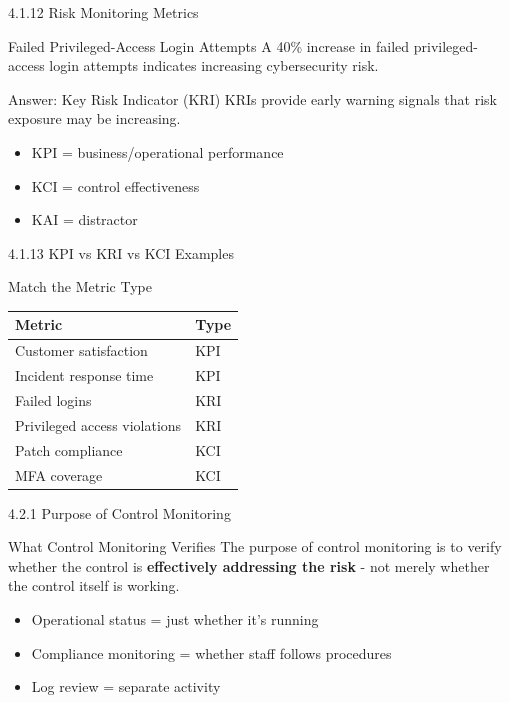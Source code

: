 \documentclass{beamer}
\begin{document}
	\begin{frame}{4.1.12 Risk Monitoring Metrics}
		\begin{block}{Failed Privileged-Access Login Attempts}
			A 40\% increase in failed privileged-access login attempts indicates increasing cybersecurity risk.
		\end{block}
		\begin{exampleblock}{Answer: Key Risk Indicator (KRI)}
			KRIs provide early warning signals that risk exposure may be increasing.
		\end{exampleblock}
		\begin{itemize}
			\item KPI = business/operational performance
			\item KCI = control effectiveness
			\item KAI = distractor
		\end{itemize}
	\end{frame}
	
	\begin{frame}{4.1.13 KPI vs KRI vs KCI Examples}
		\begin{block}{Match the Metric Type}
			\begin{tabular}{|p{5cm}|p{4cm}|}
				\hline
				\textbf{Metric} & \textbf{Type} \\
				\hline
				Customer satisfaction & KPI \\
				\hline
				Incident response time & KPI \\
				\hline
				Failed logins & KRI \\
				\hline
				Privileged access violations & KRI \\
				\hline
				Patch compliance & KCI \\
				\hline
				MFA coverage & KCI \\
				\hline
			\end{tabular}
		\end{block}
	\end{frame}
	
	\begin{frame}{4.2.1 Purpose of Control Monitoring}
		\begin{block}{What Control Monitoring Verifies}
			The purpose of control monitoring is to verify whether the control is \textbf{effectively addressing the risk} - not merely whether the control itself is working.
		\end{block}
		\begin{itemize}
			\item Operational status = just whether it's running
			\item Compliance monitoring = whether staff follows procedures
			\item Log review = separate activity
		\end{itemize}
	\end{frame}
	
\end{document}
